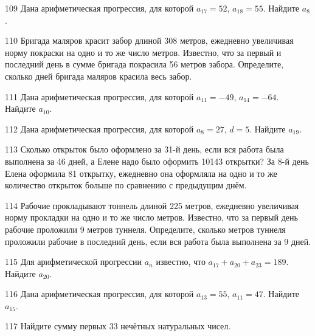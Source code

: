 \documentclass[4apaper]{article}
\begin{document}
\begin{taskBN}{109}
Дана арифметическая прогрессия, для которой $a_{17} = 52$, $a_{18} = 55$. Найдите $a_{8}$.
\end{taskBN}

\begin{taskBN}{110}
 Бригада маляров красит забор длиной 308 метров, ежедневно увеличивая норму покраски на одно и то же число метров. Известно, что за первый и последний день в сумме бригада покрасила 56 метров забора.  Определите, сколько дней бригада маляров красила весь забор. 
\end{taskBN}

\begin{taskBN}{111}
Дана арифметическая прогрессия, для которой $a_{11} = -49$, $a_{14} = -64$. Найдите $a_{10}$.
\end{taskBN}

\begin{taskBN}{112}
Дана арифметическая прогрессия, для которой $a_{8} = 27$, $d=5$. Найдите $a_{19}$.
\end{taskBN}

\begin{taskBN}{113}
Сколько открыток было оформлено за 31-й день, если вся работа была выполнена за 46 дней, а Елене надо было оформить 10143 открытки? За 8-й день Елена оформила 81 открытку, ежедневно она оформляла на одно и то же количество открыток больше по сравнению с предыдущим днём. 
\end{taskBN}

\begin{taskBN}{114}
 Рабочие прокладывают тоннель длиной 225 метров, ежедневно увеличивая норму прокладки на одно и то же число метров. Известно, что за первый день рабочие проложили 9 метров туннеля.  Определите, сколько метров туннеля проложили рабочие в последний день, если вся работа была выполнена за 9 дней.
\end{taskBN}

\begin{taskBN}{115}
Для арифметической прогрессии ${a_n}$ известно, что $a_{17} + a_{20} + a_{23}= 189$. Найдите $a_{20}$.
\end{taskBN}

\begin{taskBN}{116}
Дана арифметическая прогрессия, для которой $a_{13} = 55$, $a_{11} = 47$. Найдите $a_{15}$.
\end{taskBN}

\begin{taskBN}{117}
Найдите сумму первых 33 нечётных натуральных чисел.
\end{taskBN}
\end{document}
